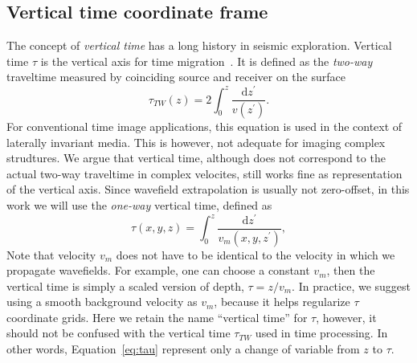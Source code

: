 \subsection{Vertical time coordinate frame}

The concept of \textit{vertical time} has a long history in seismic exploration.
Vertical time $\tau$ is the vertical axis for time migration~\cite[]{yilmaz2001sda,claerbout-iei}.
It is defined as the \textit{two-way} traveltime measured by coinciding source and receiver on the surface
\begin{equation}
  \label{eq:tautw}
  \tau_{TW}(z) = 2 \int_0^z \frac{\mathrm{d} z^\prime}{v(z^\prime)} .
\end{equation}
For conventional time image applications, this equation is used in the context of laterally invariant media.
This is however, not adequate for imaging complex strudtures.
We argue that vertical time, although does not correspond to the actual two-way traveltime in complex velocites, still works fine as representation of the vertical axis.
Since wavefield extrapolation is usually not zero-offset, in this work we will use the \textit{one-way} vertical time, defined as
\begin{equation}
  \label{eq:tau}
  \tau(x,y,z) = \int_0^z \frac{\mathrm{d} z^\prime}{v_m(x,y,z^\prime)} ,
\end{equation}
Note that velocity $v_m$ does not have to be identical to the velocity in which we propagate wavefields. For example, one can choose a constant $v_m$, then the vertical time is simply a scaled version of depth, $\tau = z / v_m$.
In practice, we suggest using a smooth background velocity as $v_m$, because it helps regularize $\tau$ coordinate grids.
Here we retain the name ``vertical time'' for $\tau$, however, it should not be confused with the vertical time $\tau_{TW}$ used in time processing.
In other words, Equation~\ref{eq:tau} represent only a change of variable from $z$ to $\tau$.

